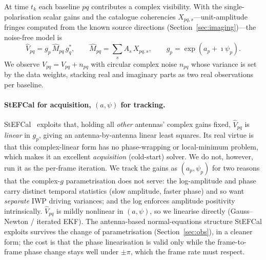 \documentclass[11pt]{article}
\begin{document}
At time $t_k$ each baseline $pq$ contributes a complex visibility. With the
single-polarisation scalar gains and the catalogue coherencies $X_{pq,s}$---unit-amplitude
fringes computed from the known source directions (Section~\ref{sec:imaging})---the noise-free
model is
\begin{equation}
  \hat V_{pq} = g_p\,\hat M_{pq}\,g_q^{\ast},\qquad
  \hat M_{pq}=\sum_{s} A_s\,X_{pq,s},\qquad
  g_p=\exp(a_p+\imath\psi_p).
  \label{eq:model}
\end{equation}
We observe $V_{pq}=\hat V_{pq}+n_{pq}$ with circular complex noise $n_{pq}$ whose variance is
set by the data weights, stacking real and imaginary parts as two real observations per
baseline.

\paragraph{StEFCal for acquisition, $(a,\psi)$ for tracking.} StEFCal~\cite{stefcal} exploits that,
holding all \emph{other} antennas' complex gains fixed, $\hat V_{pq}$ is \emph{linear} in $g_p$,
giving an antenna-by-antenna linear least squares. Its real virtue is that this complex-linear
form has no phase-wrapping or local-minimum problem, which makes it an excellent \emph{acquisition}
(cold-start) solver. We do not, however, run it as the per-frame iteration. We track the gains as
$(a_p,\psi_p)$ for two reasons that the complex-$g$ parametrisation does not serve: the
log-amplitude and phase carry distinct temporal statistics (slow amplitude, faster phase) and so
want \emph{separate} IWP driving variances; and the log enforces amplitude positivity intrinsically.
$\hat V_{pq}$ is mildly nonlinear in $(a,\psi)$, so we linearise directly (Gauss--Newton / iterated
EKF). The antenna-based normal-equations structure StEFCal exploits survives the change of
parametrisation (Section~\ref{sec:obs}), in a cleaner form; the cost is that the phase linearisation
is valid only while the frame-to-frame phase change stays well under $\pm\pi$, which the frame rate
must respect.
\end{document}
